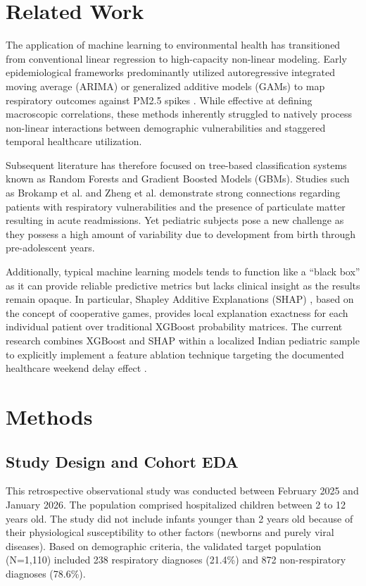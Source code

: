 \documentclass[conference]{IEEEtran}
\begin{document}
\section{Related Work}
The application of machine learning to environmental health has transitioned from conventional linear regression to high-capacity non-linear modeling. Early epidemiological frameworks predominantly utilized autoregressive integrated moving average (ARIMA) or generalized additive models (GAMs) to map respiratory outcomes against PM2.5 spikes \cite{ml_vs_arima}. While effective at defining macroscopic correlations, these methods inherently struggled to natively process non-linear interactions between demographic vulnerabilities and staggered temporal healthcare utilization.

Subsequent literature has therefore focused on tree-based classification systems known as Random Forests and Gradient Boosted Models (GBMs). Studies such as Brokamp et al. \cite{ml_asthma} and Zheng et al. \cite{pm25_pediatric} demonstrate strong connections regarding patients with respiratory vulnerabilities and the presence of particulate matter resulting in acute readmissions. Yet pediatric subjects pose a new challenge as they possess a high amount of variability due to development from birth through pre-adolescent years.

Additionally, typical machine learning models tends to function like a ``black box'' as it can provide reliable predictive metrics but lacks clinical insight as the results remain opaque. In particular, Shapley Additive Explanations (SHAP) \cite{shap}, based on the concept of cooperative games, provides local explanation exactness for each individual patient over traditional XGBoost \cite{xgboost} probability matrices. The current research combines XGBoost and SHAP within a localized Indian pediatric sample to explicitly implement a feature ablation technique targeting the documented healthcare weekend delay effect \cite{weekend_effect}.

\section{Methods}
\subsection{Study Design and Cohort EDA}
This retrospective observational study was conducted between February 2025 and January 2026. The population comprised hospitalized children between 2 to 12 years old. The study did not include infants younger than 2 years old because of their physiological susceptibility to other factors (newborns and purely viral diseases). Based on demographic criteria, the validated target population (N=1,110) included 238 respiratory diagnoses (21.4\%) and 872 non-respiratory diagnoses (78.6\%).
\end{document}
